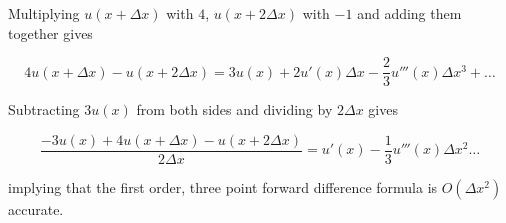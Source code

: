 \begin{solution}
\begin{enumerate}
Multiplying $u(x+\Delta x)$ with $4$,  $u(x+2\Delta x)$ with $-1$ and adding them together gives 

\[
4 u(x+ \Delta x) - u(x+2\Delta x)= 3 u(x) + 2 u'(x)\Delta x - \frac{2}{3} u'''(x)\Delta x^3 + \ldots
\]

Subtracting  $3 u(x)$ from both sides and dividing by $2 \Delta x$ gives

\[
\frac{- 3 u(x) + 4 u(x+ \Delta x)- u(x+ 2\Delta x)}{2 \Delta x}=  u'(x) -\frac{1}{3} u'''(x)\Delta x^2 \ldots
\]

implying that the first order, three point forward difference formula is $O(\Delta x^2)$ accurate. 
\end{enumerate}
\end{solution}
